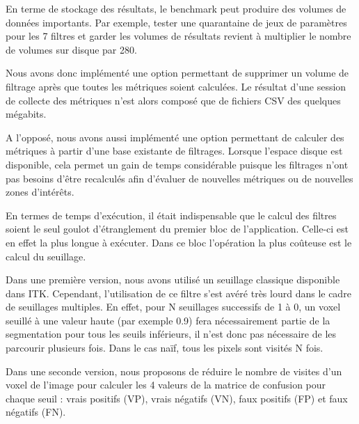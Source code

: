 En terme de stockage des résultats, le benchmark peut produire des volumes de données importants. Par exemple, tester une quarantaine de jeux de paramètres pour les 7 filtres et garder les volumes de résultats revient à multiplier le nombre de volumes sur disque par 280. 

Nous avons donc implémenté une option permettant de supprimer un volume de filtrage après que toutes les métriques soient calculées. Le résultat d'une session de collecte des métriques n'est alors composé que de fichiers CSV des quelques mégabits.

A l'opposé, nous avons aussi implémenté une option permettant de calculer des métriques à partir d'une base existante de filtrages. Lorsque l'espace disque est disponible, cela permet un gain de temps considérable puisque les filtrages n'ont pas besoins d'être recalculés afin d'évaluer de nouvelles métriques ou de nouvelles zones d'intérêts.

En termes de temps d'exécution, il était indispensable que le calcul des filtres soient le seul goulot d'étranglement du premier bloc de l'application. Celle-ci est en effet la plus longue à exécuter. Dans ce bloc l'opération la plus coûteuse est le calcul du seuillage.

Dans une première version, nous avons utilisé un seuillage classique disponible dans ITK. Cependant, l'utilisation de ce filtre s'est avéré très lourd dans le cadre de seuillages multiples. En effet, pour N seuillages successifs de 1 à 0, un voxel seuillé à une valeur haute (par exemple 0.9) fera nécessairement partie de la segmentation pour tous les seuils inférieurs, il n'est donc pas nécessaire de les parcourir plusieurs fois. Dans le cas naïf, tous les pixels sont visités N fois.

Dans une seconde version, nous proposons de réduire le nombre de visites d'un voxel de l'image pour calculer les 4 valeurs de la matrice de confusion pour chaque seuil : vrais positifs (VP), vrais négatifs (VN), faux positifs (FP) et faux négatifs (FN).




